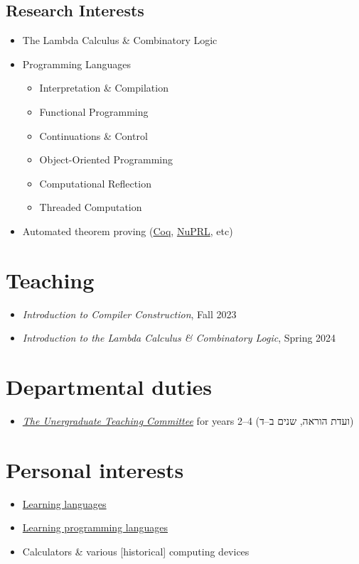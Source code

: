 \documentclass[11pt]{article}
\begin{document}
\subsection{Research Interests}
\label{sec:org0c80c3c}
\begin{itemize}
\item The Lambda Calculus \& Combinatory Logic
\item Programming Languages
\begin{itemize}
\item Interpretation \& Compilation
\item Functional Programming
\item Continuations \& Control
\item Object-Oriented Programming
\item Computational Reflection
\item Threaded Computation
\end{itemize}
\item Automated theorem proving (\href{./coq.html}{Coq}, \href{http://www.nuprl.org/}{NuPRL}, etc)
\end{itemize}

\section{Teaching}
\label{sec:orgf2f11e2}
\begin{itemize}
\item \emph{Introduction to Compiler Construction}, Fall 2023
\item \emph{Introduction to the Lambda Calculus \& Combinatory Logic}, Spring 2024
\end{itemize}

\section{Departmental duties}
\label{sec:orge110820}
\begin{itemize}
\item \href{./tc.html}{\emph{The Unergraduate Teaching Committee}} for years 2--4 (ועדת הוראה, שנים ב–ד)
\end{itemize}
\section{Personal interests}
\label{sec:org9e074cb}
\begin{itemize}
\item \href{./languages.html}{Learning languages}
\item \href{./prog-langs.html}{Learning programming languages}
\item Calculators \& various [historical] computing devices
\end{itemize}
\end{document}
